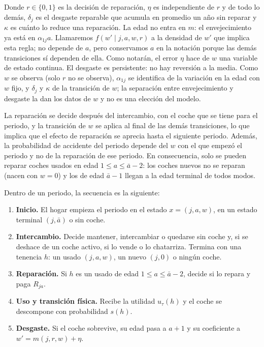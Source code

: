 \documentclass{article}
\begin{document}
Donde $r\in\{0,1\}$ es la decisión de reparación, $\eta$ es independiente de $r$ y de todo lo demás, $\delta_j$ es el desgaste reparable que acumula en promedio un año sin reparar y $\kappa$ es cuánto lo reduce una reparación. La edad no entra en $m$: el envejecimiento ya está en $\alpha_{1j}a$. Llamaremos $f(w'\mid j,a,w,r)$ a la densidad de $w'$ que implica esta regla; no depende de $a$, pero conservamos $a$ en la notación porque las demás transiciones sí dependen de ella. Como notarán, el error $\eta$ hace de $w$ una variable de estado continua. El desgaste es persistente: no hay reversión a la media. Como $w$ se observa (solo $r$ no se observa), $\alpha_{1j}$ se identifica de la variación en la edad con $w$ fijo, y $\delta_j$ y $\kappa$ de la transición de $w$; la separación entre envejecimiento y desgaste la dan los datos de $w$ y no es una elección del modelo.

La reparación se decide después del intercambio, con el coche que se tiene para el periodo, y la transición de $w$ se aplica al final de las demás transiciones, lo que implica que el efecto de reparación se aprecia hasta el siguiente periodo. Además, la probabilidad de accidente del periodo depende del $w$ con el que empezó el periodo y no de la reparación de ese periodo. En consecuencia, solo se pueden reparar coches usados en edad $1\le a\le\bar{a}-2$: los coches nuevos no se reparan (nacen con $w=0$) y los de edad $\bar{a}-1$ llegan a la edad terminal de todos modos.

Dentro de un periodo, la secuencia es la siguiente:
\begin{enumerate}
    \item \textbf{Inicio.} El hogar empieza el periodo en el estado $x=(j,a,w)$, en un estado terminal $(j,\bar{a})$ o sin coche.
    \item \textbf{Intercambio.} Decide mantener, intercambiar o quedarse sin coche y, si se deshace de un coche activo, si lo vende o lo chatarriza. Termina con una tenencia $h$: un usado $(j,a,w)$, un nuevo $(j,0)$ o ningún coche.
    \item \textbf{Reparación.} Si $h$ es un usado de edad $1\le a\le\bar{a}-2$, decide si lo repara y paga $R_{ja}$.
    \item \textbf{Uso y transición física.} Recibe la utilidad $u_\tau(h)$ y el coche se descompone con probabilidad $s(h)$.
    \item \textbf{Desgaste.} Si el coche sobrevive, su edad pasa a $a+1$ y su coeficiente a $w'=m(j,r,w)+\eta$.
\end{enumerate}
\end{document}
